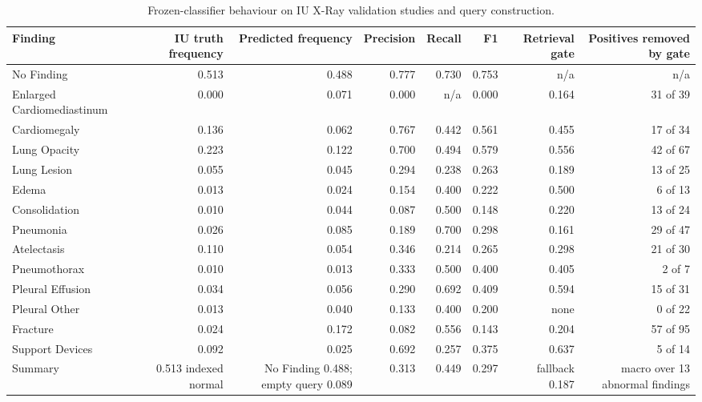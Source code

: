 \begin{table}[t]
\centering
\scriptsize
\begin{tabular}{lrrrrrrr}
\hline
Finding & IU truth frequency & Predicted frequency & Precision & Recall & F1 & Retrieval gate & Positives removed by gate \\
\hline
No Finding & 0.513 & 0.488 & 0.777 & 0.730 & 0.753 & n/a & n/a \\
Enlarged Cardiomediastinum & 0.000 & 0.071 & 0.000 & n/a & 0.000 & 0.164 & 31 of 39 \\
Cardiomegaly & 0.136 & 0.062 & 0.767 & 0.442 & 0.561 & 0.455 & 17 of 34 \\
Lung Opacity & 0.223 & 0.122 & 0.700 & 0.494 & 0.579 & 0.556 & 42 of 67 \\
Lung Lesion & 0.055 & 0.045 & 0.294 & 0.238 & 0.263 & 0.189 & 13 of 25 \\
Edema & 0.013 & 0.024 & 0.154 & 0.400 & 0.222 & 0.500 & 6 of 13 \\
Consolidation & 0.010 & 0.044 & 0.087 & 0.500 & 0.148 & 0.220 & 13 of 24 \\
Pneumonia & 0.026 & 0.085 & 0.189 & 0.700 & 0.298 & 0.161 & 29 of 47 \\
Atelectasis & 0.110 & 0.054 & 0.346 & 0.214 & 0.265 & 0.298 & 21 of 30 \\
Pneumothorax & 0.010 & 0.013 & 0.333 & 0.500 & 0.400 & 0.405 & 2 of 7 \\
Pleural Effusion & 0.034 & 0.056 & 0.290 & 0.692 & 0.409 & 0.594 & 15 of 31 \\
Pleural Other & 0.013 & 0.040 & 0.133 & 0.400 & 0.200 & none & 0 of 22 \\
Fracture & 0.024 & 0.172 & 0.082 & 0.556 & 0.143 & 0.204 & 57 of 95 \\
Support Devices & 0.092 & 0.025 & 0.692 & 0.257 & 0.375 & 0.637 & 5 of 14 \\
Summary & 0.513 indexed normal & No Finding 0.488; empty query 0.089 & 0.313 & 0.449 & 0.297 & fallback 0.187 & macro over 13 abnormal findings \\
\hline
\end{tabular}
\caption{Frozen-classifier behaviour on IU X-Ray validation studies and query construction.}
\label{tab:table5_classifier_query_domain_shift}
\end{table}
